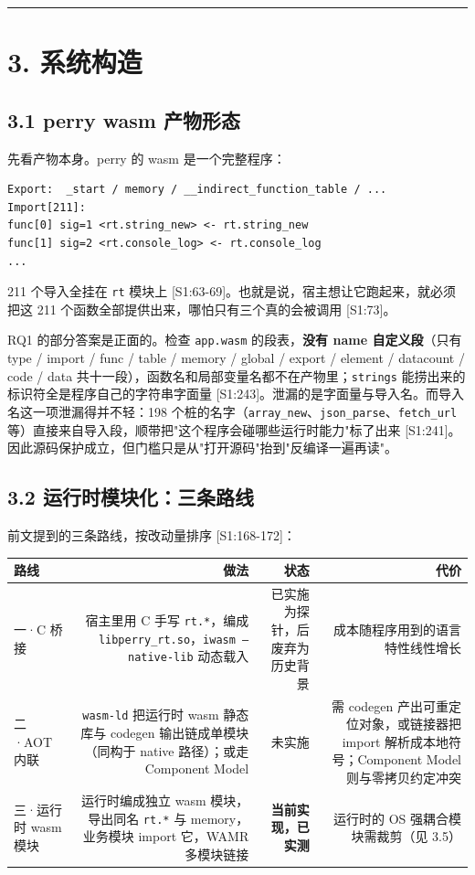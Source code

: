 \documentclass[11pt, a4paper]{article}
\begin{document}
\bigskip\hrule\bigskip

\section{3. 系统构造}

\subsection{3.1 perry wasm 产物形态}

先看产物本身。perry 的 wasm 是一个完整程序：


\begin{verbatim}
Export:  _start / memory / __indirect_function_table / ...
Import[211]:
func[0] sig=1 <rt.string_new> <- rt.string_new
func[1] sig=2 <rt.console_log> <- rt.console_log
...
\end{verbatim}

211 个导入全挂在 \texttt{rt} 模块上 [S1:63-69]。也就是说，宿主想让它跑起来，就必须把这 211 个函数全部提供出来，哪怕只有三个真的会被调用 [S1:73]。


RQ1 的部分答案是正面的。检查 \texttt{app.wasm} 的段表，\textbf{没有 name 自定义段}（只有 type / import / func / table / memory / global / export / element / datacount / code / data 共十一段），函数名和局部变量名都不在产物里；\texttt{strings} 能捞出来的标识符全是程序自己的字符串字面量 [S1:243]。泄漏的是字面量与导入名。而导入名这一项泄漏得并不轻：198 个桩的名字（\texttt{array\_new}、\texttt{json\_parse}、\texttt{fetch\_url} 等）直接来自导入段，顺带把"这个程序会碰哪些运行时能力"标了出来 [S1:241]。因此源码保护成立，但门槛只是从"打开源码"抬到"反编译一遍再读"。


\subsection{3.2 运行时模块化：三条路线}

前文提到的三条路线，按改动量排序 [S1:168-172]：


\begin{center}\small\begin{tabular}{lrrr}
\toprule
路线 & 做法 & 状态 & 代价 \\
\midrule
一·C 桥接 & 宿主里用 C 手写 \texttt{rt.*}，编成 \texttt{libperry\_rt.so}，\texttt{iwasm --native-lib} 动态载入 & 已实施为探针，后废弃为历史背景 & 成本随程序用到的语言特性线性增长 \\
二·AOT 内联 & \texttt{wasm-ld} 把运行时 wasm 静态库与 codegen 输出链成单模块（同构于 native 路径）；或走 Component Model & 未实施 & 需 codegen 产出可重定位对象，或链接器把 import 解析成本地符号；Component Model 则与零拷贝约定冲突 \\
三·运行时 wasm 模块 & 运行时编成独立 wasm 模块，导出同名 \texttt{rt.*} 与 memory，业务模块 import 它，WAMR 多模块链接 & \textbf{当前实现，已实测} & 运行时的 OS 强耦合模块需裁剪（见 3.5） \\
\bottomrule
\end{tabular}\end{center}
\end{document}
